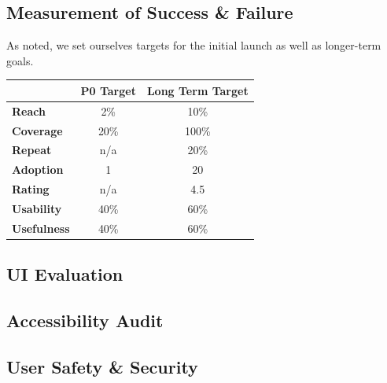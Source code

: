 \subsection{Measurement of Success \& Failure}
As noted, we set ourselves targets for the initial launch as well as longer-term goals.

\begin{table}[H]
\centering
\begin{tabular}{@{}lcc@{}}
\toprule
                  & \multicolumn{1}{l}{\textbf{P0 Target}} & \multicolumn{1}{l}{\textbf{Long Term Target}} \\ \midrule
\textbf{Reach}    & 2\%                                   & 10\%                                         \\
\textbf{Coverage} & 20\%                                  & 100\%                                        \\
\textbf{Repeat}   & n/a                                   & 20\%                                         \\
\textbf{Adoption} & 1                                     & 20                                           \\
\textbf{Rating}   & n/a                                   & 4.5                                          \\ 
\textbf{Usability}   & 40\%                                   & 60\%                                          \\ 
\textbf{Usefulness}   & 40\%                                 & 60\%                                          \\ \bottomrule

\end{tabular}
\end{table}

\subsection{UI Evaluation}\label{sec:uieval}


\subsection{Accessibility Audit}\label{sec:access}


\subsection{User Safety \& Security}\label{sec:access}



